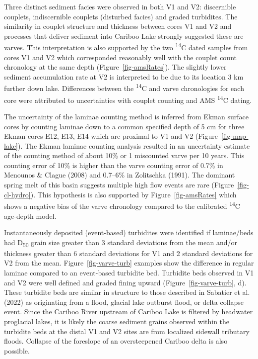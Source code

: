 \documentclass[
  letterpaper,
  DIV=11,
  numbers=noendperiod]{scrartcl}
\begin{document}
Three distinct sediment facies were observed in both V1 and V2:
discernible couplets, indiscernible couplets (disturbed facies) and
graded turbidites. The similarity in couplet structure and thickness
between cores V1 and V2 and processes that deliver sediment into Cariboo
Lake strongly suggested these are varves. This interpretation is also
supported by the two \textsuperscript{14}C dated samples from cores V1
and V2 which corresponded reasonably well with the couplet count
chronology at the same depth (Figure~\ref{fig-amsRates}). The slightly
lower sediment accumulation rate at V2 is interpreted to be due to its
location 3 km further down lake. Differences between the
\textsuperscript{14}C and varve chronologies for each core were
attributed to uncertainties with couplet counting and AMS
\textsuperscript{14}C dating.

The uncertainty of the laminae counting method is inferred from Ekman
surface cores by counting laminae down to a common specified depth of 5
cm for three Ekman cores E12, E13, E14 which are proximal to V1 and V2
(Figure~\ref{fig-map-lake}). The Ekman laminae counting analysis
resulted in an uncertainty estimate of the counting method of about 10\%
or 1 miscounted varve per 10 years. This counting error of 10\% is
higher than the varve counting error of 0.7\% in Menounos \& Clague
(2008) and 0.7--6\% in Zolitschka (1991). The dominant spring melt of
this basin suggests multiple high flow events are rare
(Figure~\ref{fig-cl-hydro}). This hypothesis is also supported by
Figure~\ref{fig-amsRates} which shows a negative bias of the varve
chronology compared to the calibrated \textsuperscript{14}C age-depth
model.

Instantaneously deposited (event-based) turbidites were identified if
laminae/beds had D\textsubscript{50} grain size greater than 3 standard
deviations from the mean and/or thickness greater than 6 standard
deviations for V1 and 2 standard deviations for V2 from the mean.
Figure~\ref{fig-varve-turb} examples show the difference in regular
laminae compared to an event-based turbidite bed. Turbidite beds
observed in V1 and V2 were well defined and graded fining upward
(Figure~\ref{fig-varve-turb}, d). These turbidite beds are similar in
structure to those described in Sabatier et al. (2022) as originating
from a flood, glacial lake outburst flood, or delta collapse event.
Since the Cariboo River upstream of Cariboo Lake is filtered by
headwater proglacial lakes, it is likely the coarse sediment grains
observed within the turbidite beds at the distal V1 and V2 sites are
from localized sidewall tributary floods. Collapse of the foreslope of
an oversteepened Cariboo delta is also possible.
\end{document}

